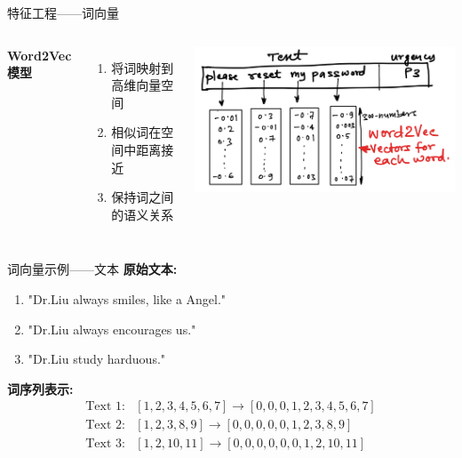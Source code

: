 \documentclass{beamer}
\begin{document}
\begin{frame}{特征工程——词向量}
    \begin{columns}
        \textbf{Word2Vec模型}
        \begin{enumerate}
            \item 将词映射到高维向量空间
            \item 相似词在空间中距离接近
            \item 保持词之间的语义关系
        \end{enumerate}

        \begin{center}
            \includegraphics[width=\textwidth]{pic/word2Vec.png}
        \end{center}
    \end{columns}
\end{frame}

\begin{frame}{词向量示例——文本}
    \textbf{原始文本:}
    \begin{enumerate}
        \item "Dr.Liu always smiles, like a Angel."
        \item "Dr.Liu always encourages us."
        \item "Dr.Liu study harduous."
    \end{enumerate}

    \vspace{0.3cm}
    \textbf{词序列表示:}
    \begin{align*}
        \text{Text 1:} & [1, 2, 3, 4, 5, 6, 7] \rightarrow [0, 0, 0, 1, 2, 3, 4, 5, 6, 7] \\
        \text{Text 2:} & [1, 2, 3, 8, 9] \rightarrow [0, 0, 0, 0, 0, 1, 2, 3, 8, 9] \\
        \text{Text 3:} & [1, 2, 10, 11] \rightarrow [0, 0, 0, 0, 0, 0, 1, 2, 10, 11]
    \end{align*}
\end{frame}
\end{document}
